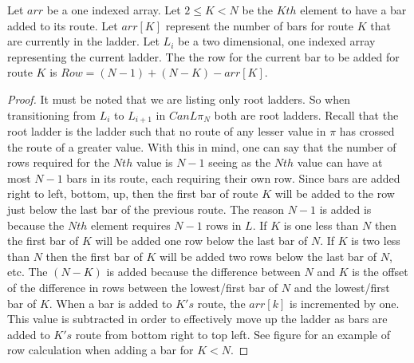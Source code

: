 \begin{lemma}
  Let $arr$ be a one indexed array. Let $2 \leq K < N$ be the $Kth$ element to have a bar added to its route. 
  Let $arr[K]$ represent the number of bars for route $K$ that are currently in the 
  ladder. Let $L_{i}$ be a two dimensional, one indexed array representing the current ladder.
  The the row for the current bar to be added for route $K$ is $Row=(N-1) + (N-K) - arr[K]$.
\end{lemma}
\begin{proof}
   It must be noted that we are listing only root ladders. So when transitioning from 
$L_{i}$ to $L_{i+1}$ in $CanL{\pi_{N}}$ both are root ladders. Recall that the root ladder is the ladder such that no  
route of any lesser value in $\pi$ has crossed the route of a greater value. With this in mind, one can say that the 
number of rows required for the $Nth$ value is $N-1$ seeing as the $Nth$ value can have at most $N-1$ bars in its route, each requiring  their own 
row. Since bars are added right to left, bottom, up, then the first bar of route $K$ will be added to the row 
just  below the last bar of the previous route. The reason $N-1$ is added is because the $Nth$ element requires 
$N-1$ rows in $L$. If $K$ is one less than $N$ then 
the first bar of $K$ will be added one row below the last bar of $N$. If $K$ is two less than $N$ then the first bar 
of $K$ will be added two rows below the last bar of $N$, etc. The $(N-K)$ is added because 
the difference between $N$ and $K$ is the offset of the difference in rows between the lowest/first bar of $N$ 
and the lowest/first bar of $K$. When a bar is added to $K's$ route, the $arr[k]$ is incremented by one. This value is subtracted in 
order to effectively move up the ladder as bars are added to $K's$ route from bottom right to top left. See figure for an example of 
row calculation when adding a bar for $K < N$.
\end{proof}\pagebreak

